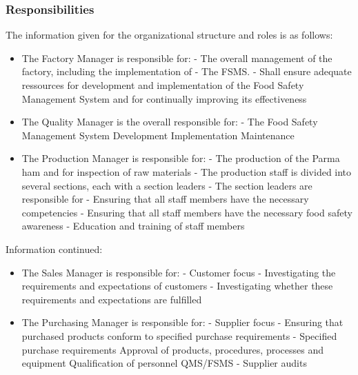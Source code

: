 \subsubsection*{Responsibilities}
 
\begin{highlight}
    The information given for the organizational structure and roles is as follows:

\begin{itemize}
\item The Factory Manager is responsible for:
\subitem - The overall management of the factory, including the implementation of 
\subitem - The FSMS.
\subitem - Shall ensure adequate ressources for development and implementation of the Food Safety \subitem Management System and for continually improving its effectiveness

\item The Quality Manager is the overall responsible for:
\subitem - The Food Safety Management System
\subsubitem * Development
\subsubitem * Implementation
\subsubitem * Maintenance

\item The Production Manager is responsible for:
\subitem  - The production of the Parma ham and for inspection of raw materials
\subitem - The production staff is divided into
several sections, each with a section leaders
\subitem - The section leaders are responsible for
\subitem - Ensuring that all staff members have the necessary competencies
\subitem - Ensuring that all staff members
have the necessary food safety awareness
\subitem - Education and training of staff members

\end{itemize}
\end{highlight}

\begin{highlight}
    Information continued:
    \begin{itemize}
        \item The Sales Manager is responsible for:
        \subitem - Customer focus
        \subitem - Investigating the requirements and expectations of customers
        \subitem - Investigating whether these requirements and expectations are fulfilled

        \item The Purchasing Manager is responsible for:
        \subitem - Supplier focus
        \subitem - Ensuring that purchased products conform to specified purchase requirements
        \subitem - Specified purchase requirements
        \subsubitem * Approval of products, procedures, processes and equipment
        \subsubitem * Qualification of personnel
        \subsubitem * QMS/FSMS
        \subitem - Supplier audits

    \end{itemize}
\end{highlight}


